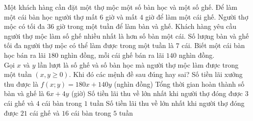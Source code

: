 \begin{ex}%
	Một khách hàng cần đặt một thợ mộc một số bàn học và một số ghế. Để làm một cái bàn học người thợ mất $6$ giờ và mất $4$ giờ để làm một cái ghế. Người thợ mộc có tối đa $36$ giờ trong một tuần để làm bàn và ghế. Khách hàng yêu cầu người thợ mộc làm số ghế nhiều nhất là hơn số bàn một cái. Số lượng bàn và ghế tối đa người thợ mộc có thể làm được trong một tuần là $7$ cái. Biết một cái bàn học bán ra lãi $180$ nghìn đồng, mỗi cái ghế bán ra lãi $140$ nghìn đồng.\\
	Gọi $x$ và $y$ lần lượt là số ghế và số bàn học mà người thợ mộc làm được trong một tuần $\left( x,y\ge 0 \right)$. Khi đó các mệnh đề sau đúng hay sai?
	\choiceTF
	{Số tiền lãi xưởng thu được là $f\left( x;y \right)=180x+140y$ (nghìn đồng)}
	{Tổng thời gian hoàn thành số bàn và ghế là $6x+4y$ (giờ)}
	{\True Số tiền lãi thu về lớn nhất khi người thợ đóng được $3$ cái ghế và $4$ cái bàn trong $1$ tuần}
	{Số tiền lãi thu về lớn nhất khi người thợ đóng được $21$ cái ghế và $16$ cái bàn trong $5$ tuần}
\end{ex}
